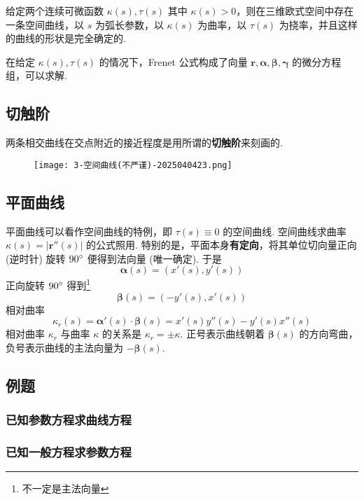 \begin{theorem}[空间曲线基本定理]
给定两个连续可微函数 $\kappa(s),\tau(s)$ 其中 $\kappa(s)>0$，则在三维欧式空间中存在一条空间曲线，以 $s$ 为弧长参数，以 $\kappa(s)$ 为曲率，以 $\tau(s)$ 为挠率，并且这样的曲线的形状是完全确定的.
\end{theorem}
\begin{remark}
在给定 $\kappa(s),\tau (s)$ 的情况下，Frenet 公式构成了向量 $\boldsymbol{r},\boldsymbol{\alpha},\boldsymbol{\beta},\boldsymbol{\gamma}$ 的微分方程组，可以求解.
\end{remark}
\subsection{切触阶}

两条相交曲线在交点附近的接近程度是用所谓的\textbf{切触阶}来刻画的.
\begin{figure}[H]
\centering
\texttt{[image: 3-空间曲线(不严谨)-2025040423.png]}
\label{}
\end{figure}

\subsection{平面曲线}

平面曲线可以看作空间曲线的特例，即 $\tau(s)\equiv0$ 的空间曲线. 空间曲线求曲率 $\kappa(s)=\lvert \boldsymbol{r}''(s) \rvert$ 的公式照用. 特别的是，平面本身\textbf{有定向}，将其单位切向量正向 (逆时针) 旋转 $90^\circ$ 便得到法向量 (唯一确定). 于是
\[
\boldsymbol{\alpha}(s)=(x'(s),y'(s))
\]
正向旋转 $90^\circ$ 得到\footnote{不一定是主法向量}
\[
\boldsymbol{\beta}(s)=(-y'(s),x'(s))
\]
相对曲率
\[
\kappa_{r}(s)=\boldsymbol{\alpha}'(s)\cdot\boldsymbol{\beta}(s)=x'(s)y''(s)-y'(s)x''(s)
\]
相对曲率 $\kappa_{r}$ 与曲率 $\kappa$ 的关系是 $\kappa_{r}=\pm\kappa$. 正号表示曲线朝着 $\boldsymbol{\beta}(s)$ 的方向弯曲，负号表示曲线的主法向量为 $-\boldsymbol{\beta}(s)$.

\subsection{例题}

\subsubsection{已知参数方程求曲线方程}

\subsubsection{已知一般方程求参数方程}

